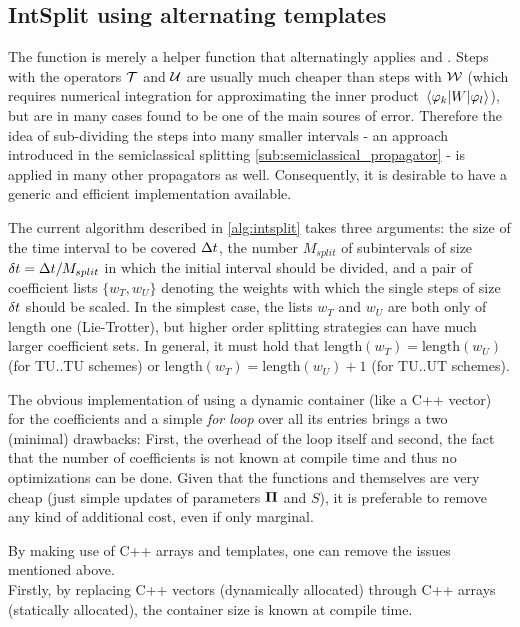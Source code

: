 \subsection{IntSplit using alternating templates}
\label{subsec:intsplit}
%
The  function is merely a helper function that alternatingly applies  and .
Steps with the operators $\mathcal{T}$ and $\mathcal{U}$ are usually much cheaper than steps with $\mathcal{W}$ (which requires numerical integration for approximating the inner product $\matrixel{\varphi_k}{W}{\varphi_l}$), but are in many cases found to be one of the main soures of error.
Therefore the idea of sub-dividing the steps into many smaller intervals - an approach introduced in the semiclassical splitting \ref{sub:semiclassical_propagator} - is applied in many other propagators as well.
Consequently, it is desirable to have a generic and efficient implementation available.
\par\medskip
%
The current  algorithm described in \ref{alg:intsplit} takes three arguments:
the size of the time interval to be covered $\Delta t$, the number $M_{split}$ of subintervals of size $\delta t = \Delta t/M_{split}$ in which the initial interval should be divided, and a pair of coefficient lists $\{ w_T, w_U \}$ denoting the weights with which the single steps of size $\delta t$ should be scaled.
In the simplest case, the lists $w_T$ and $w_U$ are both only of length one (Lie-Trotter), but higher order splitting strategies can have much larger coefficient sets.
In general, it must hold that $\text{length}(w_T) = \text{length}(w_U)$ (for TU..TU schemes) or $\text{length}(w_T) = \text{length}(w_U)+1$ (for TU..UT schemes).
\par\medskip
%
The obvious implementation of using a dynamic container (like a C++ vector) for the coefficients and a simple \emph{for loop} over all its entries brings a two (minimal) drawbacks: First, the overhead of the loop itself and second, the fact that the number of coefficients is not known at compile time and thus no optimizations can be done.
Given that the functions  and  themselves are very cheap (just simple updates of parameters $\bm{\Pi}$ and $S$), it is preferable to remove any kind of additional cost, even if only marginal.
\par\medskip
%
By making use of C++ arrays and templates, one can remove the issues mentioned above. \\
%
Firstly, by replacing C++ vectors (dynamically allocated) through C++ arrays (statically allocated), the container size is known at compile time.
